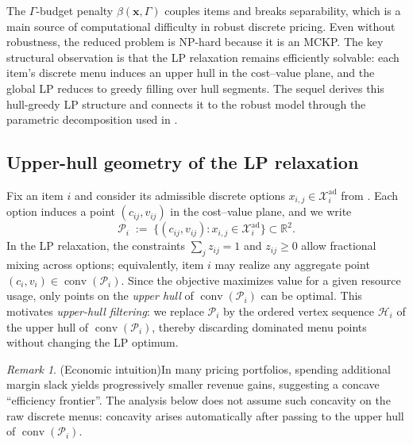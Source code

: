 \documentclass[11pt, a4paper]{article}
\theoremstyle{plain}
\theoremstyle{definition}
\theoremstyle{remark}
\newtheorem{remark}[remark]{Remark}
\begin{document}
The $\Gamma$-budget penalty $\beta(\bm{x},\Gamma)$ couples items and breaks separability, which is a main source of computational difficulty
in robust discrete pricing. Even without robustness, the reduced problem is NP-hard because it is an MCKP. The key structural observation is
that the LP relaxation remains efficiently solvable: each item's discrete menu induces an upper hull in the cost--value plane, and the global
LP reduces to greedy filling over hull segments. The sequel derives this hull-greedy LP structure and connects it to the robust model through
the parametric decomposition used in .

\subsection{Upper-hull geometry of the LP relaxation}\label{subsec:hull_lp}
Fix an item $i$ and consider its admissible discrete options $x_{i,j}\in\mathcal X_i^{\mathrm{ad}}$ from .
Each option induces a point $(c_{ij},v_{ij})$ in the cost--value plane, and we write
\[
\mathcal P_i \;:=\;\{(c_{ij},v_{ij}) : x_{i,j}\in\mathcal X_i^{\mathrm{ad}}\}\subset\mathbb R^2.
\]
In the LP relaxation, the constraints $\sum_j z_{ij}=1$ and $z_{ij}\ge 0$ allow fractional mixing across options; equivalently, item $i$
may realize any aggregate point $(c_i,v_i)\in\operatorname{conv}(\mathcal P_i)$. Since the objective maximizes value for a given resource
usage, only points on the \emph{upper hull} of $\operatorname{conv}(\mathcal P_i)$ can be optimal. This motivates
\emph{upper-hull filtering}: we replace $\mathcal P_i$ by the ordered vertex sequence $\mathcal H_i$ of the upper hull of
$\operatorname{conv}(\mathcal P_i)$, thereby discarding dominated menu points without changing the LP optimum.

\begin{remark}(Economic intuition)\label{rem:diminishing_returns}
In many pricing portfolios, spending additional margin slack yields progressively smaller revenue gains, suggesting a concave
``efficiency frontier''. The analysis below does not assume such concavity on the raw discrete menus: concavity arises automatically after
passing to the upper hull of $\operatorname{conv}(\mathcal P_i)$.
\end{remark}
\end{document}
